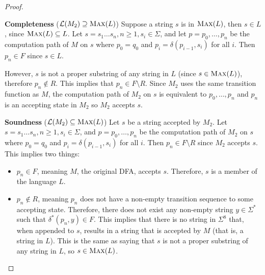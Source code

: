 \begin{problem}
\begin{Answer}
\begin{enumalph}
\begin{claim}
\begin{proof}
          \step
          \begin{enumroman}
            \item \textbf{Completeness} ($\mathcal{L}(M_2) \supseteq \textsc{Max}(L)$)
            Suppose a string $s$ is in $\textsc{Max}(L)$,
            then $s \in L$, since $\textsc{Max}(L) \subseteq L$.
            Let $s = s_1 \ldots s_n, n \ge 1, s_i \in \Sigma$,
            and let $p = p_0, \ldots, p_n$ be the computation path of $M$ on $s$
            where $p_0 = q_0$ and $p_i = \delta(p_{i-1}, s_i)$ for all $i$.
            Then $p_n \in F$ since $s \in L$.
            
            \step
            However, $s$ is not a proper substring of any string in $L$
            (since $s \in \textsc{Max}(L)$), therefore $p_n \notin R$.
            This implies that $p_n \in F \setminus R$.
            Since $M_2$ uses the same transition function as $M$,
            the computation path of $M_2$ on $s$ is equivalent to $p_0, \ldots, p_n$
            and $p_n$ is an accepting state in $M_2$ so $M_2$ accepts $s$.
            \item \textbf{Soundness} ($\mathcal{L}(M_2) \subseteq \textsc{Max}(L)$)
              Let $s$ be a string accepted by $M_2$.
              Let $s = s_1 \ldots s_n, n \ge 1, s_i \in \Sigma$,
              and $p = p_0, \ldots, p_n$ be the computation path of $M_2$ on $s$
              where $p_0 = q_0$ and $p_i = \delta(p_{i-1}, s_i)$ for all $i$.
              Then $p_n \in F \setminus R$ since $M_2$ accepts $s$.
              This implies two things:
              \begin{itemize}
                \item $p_n \in F$, meaning $M$, the original DFA, accepts $s$.
                  Therefore, $s$ is a member of the language $L$.
                \item $p_n \notin R$, meaning $p_n$ does not have a non-empty transition sequence to some accepting state.
                  Therefore, there does not exist any non-empty string $y \in \Sigma^*$
                  such that $\delta^*(p_n, y) \in F$.
                  This implies that there is no string in $\Sigma^8$ that, when appended to $s$,
                  results in a string that is accepted by $M$ (that is, a string in $L$).
                  This is the same as saying that $s$ is not a proper substring of any string in $L$,
                  so $s \in \textsc{Max}(L)$.
              \end{itemize}
          \end{enumroman}
        \end{proof}
      \end{claim}
    \end{enumalph}
  \end{Answer}
\end{problem}
